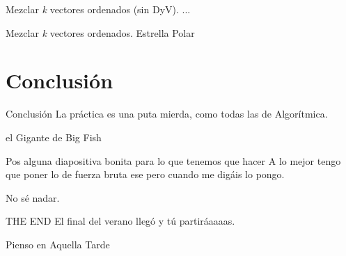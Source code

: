 \documentclass[10pt, xcolor=table]{beamer}
\begin{document}
\begin{frame}[fragile]{Mezclar \textit{k} vectores ordenados (sin DyV). }
...
\end{frame}
\begin{frame}[fragile]{Mezclar \textit{k} vectores ordenados. }
Estrella Polar
\end{frame}


\section{Conclusión}

\begin{frame}{Conclusión}
La práctica es una puta mierda, como todas las de Algorítmica.

el Gigante de Big Fish
\end{frame}


\begin{frame}{Pos alguna diapositiva bonita para lo que tenemos que hacer}
A lo mejor tengo que poner lo de fuerza bruta ese pero cuando me digáis lo pongo.

No sé nadar.
\end{frame}

\begin{frame}{THE END}
El final del verano llegó y tú partiráaaaas. 

Pienso en Aquella Tarde
\end{frame}
\end{document}
